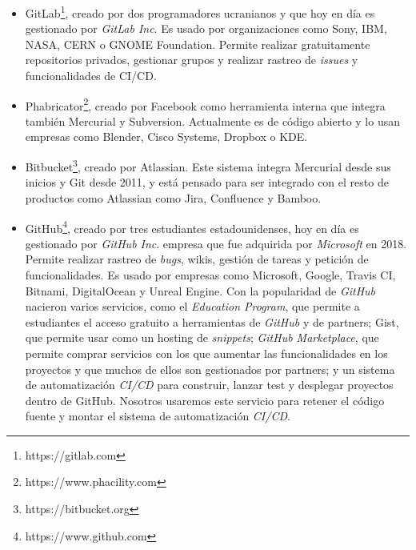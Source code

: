 \begin{itemize}
	\item GitLab\footnote{https://gitlab.com}, creado por dos programadores ucranianos y que hoy en día es gestionado por \textit{GitLab Inc}. Es usado por organizaciones como Sony, IBM, NASA, CERN o GNOME Foundation. Permite realizar gratuitamente repositorios privados, gestionar grupos y realizar rastreo de \textit{issues} y funcionalidades de CI/CD.
	\item Phabricator\footnote{https://www.phacility.com}, creado por Facebook como herramienta interna que integra también Mercurial y Subversion. Actualmente es de código abierto y lo usan empresas como Blender, Cisco Systems, Dropbox o KDE.
	\item Bitbucket\footnote{https://bitbucket.org}, creado por Atlassian. Este sistema integra Mercurial desde sus inicios y Git desde 2011, y está pensado para ser integrado con el resto de productos como Atlassian como Jira, Confluence y Bamboo.
	\item GitHub\footnote{https://www.github.com}, creado por tres estudiantes estadounidenses, hoy en día es gestionado por \textit{GitHub Inc}. empresa que fue adquirida por \textit{Microsoft} en 2018. Permite realizar rastreo de \textit{bugs}, wikis, gestión de tareas y petición de funcionalidades. Es usado por empresas como Microsoft, Google, Travis CI, Bitnami, DigitalOcean y Unreal Engine. Con la popularidad de \textit{GitHub} nacieron varios servicios, como el \textit{Education Program}, que permite a estudiantes el acceso gratuito a herramientas de \textit{GitHub} y de partners; Gist, que permite usar  como un hosting de \textit{snippets}; \textit{GitHub Marketplace}, que permite comprar servicios con los que aumentar las funcionalidades en los proyectos y que muchos de ellos son gestionados por partners; y  un sistema de automatización \textit{CI/CD} para construir, lanzar test y desplegar proyectos dentro de GitHub. Nosotros usaremos este servicio para retener el código fuente y montar el sistema de automatización \textit{CI/CD}.
\end{itemize}